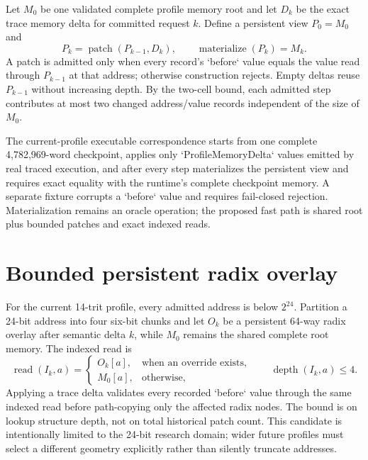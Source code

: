 \documentclass{article}
\begin{document}
Let $M_0$ be one validated complete profile memory root and let $D_k$ be the
exact trace memory delta for committed request $k$. Define a persistent view
$P_0=M_0$ and
\begin{equation}
  P_k = \operatorname{patch}(P_{k-1},D_k),
  \qquad
  \operatorname{materialize}(P_k)=M_k.
  \label{eq:state-graph-persistent-memory}
\end{equation}
A patch is admitted only when every record's `before` value equals the value read
through $P_{k-1}$ at that address; otherwise construction rejects. Empty deltas
reuse $P_{k-1}$ without increasing depth. By the two-cell bound, each admitted
step contributes at most two changed address/value records independent of the
size of $M_0$.

The current-profile executable correspondence starts from one complete
4,782,969-word checkpoint, applies only `ProfileMemoryDelta` values emitted by
real traced execution, and after every step materializes the persistent view and
requires exact equality with the runtime's complete checkpoint memory. A
separate fixture corrupts a `before` value and requires fail-closed rejection.
Materialization remains an oracle operation; the proposed fast path is shared
root plus bounded patches and exact indexed reads.

\section{Bounded persistent radix overlay}

For the current 14-trit profile, every admitted address is below $2^{24}$.
Partition a 24-bit address into four six-bit chunks and let $O_k$ be a persistent
64-way radix overlay after semantic delta $k$, while $M_0$ remains the shared
complete root memory. The indexed read is
\begin{equation}
  \operatorname{read}(I_k,a)=
  \begin{cases}
    O_k[a], & \text{when an override exists},\\
    M_0[a], & \text{otherwise},
  \end{cases}
  \qquad \operatorname{depth}(I_k,a)\leq4.
  \label{eq:state-graph-indexed-memory}
\end{equation}
Applying a trace delta validates every recorded `before` value through the same
indexed read before path-copying only the affected radix nodes. The bound is on
lookup structure depth, not on total historical patch count. This candidate is
intentionally limited to the 24-bit research domain; wider future profiles must
select a different geometry explicitly rather than silently truncate addresses.
\end{document}

